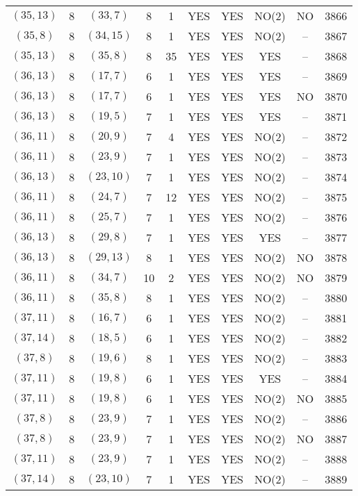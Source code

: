 \begin{longtable}{|c|c|c|c|c|c|c|c|c|c|}
$(35, 13)$ & 8 & $(33, 7)$ & 8 & 1 & YES & YES & NO(2) & NO & 3866\\
$(35, 8)$ & 8 & $(34, 15)$ & 8 & 1 & YES & YES & NO(2) & -- & 3867\\
$(35, 13)$ & 8 & $(35, 8)$ & 8 & 35 & YES & YES & YES & -- & 3868\\
$(36, 13)$ & 8 & $(17, 7)$ & 6 & 1 & YES & YES & YES & -- & 3869\\
$(36, 13)$ & 8 & $(17, 7)$ & 6 & 1 & YES & YES & YES & NO & 3870\\
$(36, 13)$ & 8 & $(19, 5)$ & 7 & 1 & YES & YES & YES & -- & 3871\\
$(36, 11)$ & 8 & $(20, 9)$ & 7 & 4 & YES & YES & NO(2) & -- & 3872\\
$(36, 11)$ & 8 & $(23, 9)$ & 7 & 1 & YES & YES & NO(2) & -- & 3873\\
$(36, 13)$ & 8 & $(23, 10)$ & 7 & 1 & YES & YES & NO(2) & -- & 3874\\
$(36, 11)$ & 8 & $(24, 7)$ & 7 & 12 & YES & YES & NO(2) & -- & 3875\\
$(36, 11)$ & 8 & $(25, 7)$ & 7 & 1 & YES & YES & NO(2) & -- & 3876\\
$(36, 13)$ & 8 & $(29, 8)$ & 7 & 1 & YES & YES & YES & -- & 3877\\
$(36, 13)$ & 8 & $(29, 13)$ & 8 & 1 & YES & YES & NO(2) & NO & 3878\\
$(36, 11)$ & 8 & $(34, 7)$ & 10 & 2 & YES & YES & NO(2) & NO & 3879\\
$(36, 11)$ & 8 & $(35, 8)$ & 8 & 1 & YES & YES & NO(2) & -- & 3880\\
$(37, 11)$ & 8 & $(16, 7)$ & 6 & 1 & YES & YES & NO(2) & -- & 3881\\
$(37, 14)$ & 8 & $(18, 5)$ & 6 & 1 & YES & YES & NO(2) & -- & 3882\\
$(37, 8)$ & 8 & $(19, 6)$ & 8 & 1 & YES & YES & NO(2) & -- & 3883\\
$(37, 11)$ & 8 & $(19, 8)$ & 6 & 1 & YES & YES & YES & -- & 3884\\
$(37, 11)$ & 8 & $(19, 8)$ & 6 & 1 & YES & YES & NO(2) & NO & 3885\\
$(37, 8)$ & 8 & $(23, 9)$ & 7 & 1 & YES & YES & NO(2) & -- & 3886\\
$(37, 8)$ & 8 & $(23, 9)$ & 7 & 1 & YES & YES & NO(2) & NO & 3887\\
$(37, 11)$ & 8 & $(23, 9)$ & 7 & 1 & YES & YES & NO(2) & -- & 3888\\
$(37, 14)$ & 8 & $(23, 10)$ & 7 & 1 & YES & YES & NO(2) & -- & 3889\\

\end{longtable}
